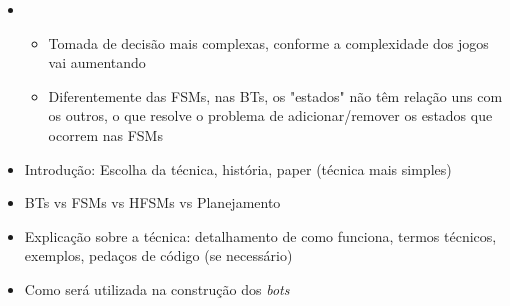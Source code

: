 \begin{mdframed}[backgroundcolor=green!20]
\begin{itemize}
    \item
        \begin{itemize}
            \item
                Tomada de decisão mais complexas, conforme a complexidade dos
                jogos vai aumentando
            \item
                Diferentemente das FSMs, nas BTs, os "estados" não têm relação
                uns com os outros, o que resolve o problema de adicionar/remover
                os estados que ocorrem nas FSMs
        \end{itemize}
    \item
        Introdução: Escolha da técnica, história, paper (técnica mais simples)
    \item
        BTs vs FSMs vs HFSMs vs Planejamento
    \item
        Explicação sobre a técnica: detalhamento de como funciona, termos
        técnicos, exemplos, pedaços de código (se necessário)
    \item
        Como será utilizada na construção dos \textit{bots}
\end{itemize}
\end{mdframed}
